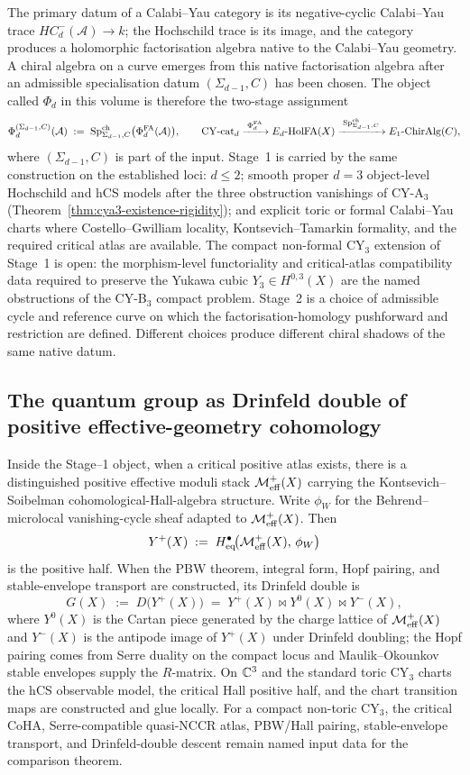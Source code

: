 The primary datum of a Calabi--Yau category is its negative-cyclic
Calabi--Yau trace \(HC^-_d(\mathcal A)\to k\); the Hochschild trace is
its image, and the category produces a holomorphic factorisation
algebra native to the Calabi--Yau geometry. A chiral algebra on a
curve emerges from this native factorisation algebra after an
admissible specialisation datum \((\Sigma_{d-1}, C)\) has been chosen.
The object called \(\Phi_d\) in this volume is therefore the two-stage
assignment
\[
\Phi_d^{(\Sigma_{d-1}, C)}(\mathcal A)
\;:=\;
\mathrm{Sp}^{\mathrm{ch}}_{\Sigma_{d-1}, C}\bigl(\Phi^{\mathrm{FA}}_d(\mathcal A)\bigr),
\qquad
\mathrm{CY}\text{-cat}_d
\xrightarrow{\;\Phi^{\mathrm{FA}}_d\;}
E_d\text{-}\mathrm{HolFA}(X)
\xrightarrow{\;\mathrm{Sp}^{\mathrm{ch}}_{\Sigma_{d-1}, C}\;}
E_1\text{-}\mathrm{ChirAlg}(C),
\]
where \((\Sigma_{d-1}, C)\) is part of the input. Stage~1 is carried by
the same construction on the established loci: \(d \leq 2\); smooth
proper \(d=3\) object-level Hochschild and hCS models after the three
obstruction vanishings of CY-A$_3$
(Theorem~\ref{thm:cya3-existence-rigidity}); and explicit toric or
formal Calabi--Yau charts where Costello--Gwilliam locality,
Kontsevich--Tamarkin formality, and the required critical atlas are
available. The compact non-formal CY$_3$ extension of Stage~1 is open: the
morphism-level functoriality and critical-atlas compatibility data
required to preserve the Yukawa cubic $Y_3 \in H^{0,3}(X)$ are the
named obstructions of the CY-B$_3$ compact problem. Stage~2 is a
choice of admissible cycle
and reference curve on which the factorisation-homology pushforward and
restriction are defined. Different choices produce different chiral
shadows of the same native datum.

\subsection*{The quantum group as Drinfeld double of positive
effective-geometry cohomology}
\label{wn:sec:platonic-preface-quantum-group}

Inside the Stage--1 object, when a critical positive atlas exists, there
is a distinguished positive effective moduli stack $\mathcal{M}^{+}_{\mathrm{eff}}(X)$ carrying
the Kontsevich--Soibelman cohomological-Hall-algebra structure. Write
$\phi_W$ for the Behrend--microlocal vanishing-cycle sheaf adapted to
$\mathcal{M}^{+}_{\mathrm{eff}}(X)$. Then
\[
Y^+(X) \;:=\; H^{\bullet}_{\mathrm{eq}}\!\bigl(\mathcal{M}^{+}_{\mathrm{eff}}(X),\,\phi_W\bigr)
\]
is the positive half. When the PBW theorem, integral form, Hopf pairing,
and stable-envelope transport are constructed, its Drinfeld double is
\[
G(X) \;:=\; D\bigl(Y^+(X)\bigr) \;=\; Y^+(X) \bowtie Y^0(X) \bowtie Y^-(X),
\]
where $Y^0(X)$ is the Cartan piece generated by the charge lattice of
$\mathcal{M}^{+}_{\mathrm{eff}}(X)$ and $Y^-(X)$ is the antipode image of $Y^+(X)$ under
Drinfeld doubling; the Hopf pairing comes from Serre duality on the
compact locus and Maulik--Okounkov stable envelopes supply the
$R$-matrix. On
\(\mathbb{C}^3\) and the standard toric CY$_3$ charts the hCS observable
model, the critical Hall positive half, and the chart transition maps
are constructed and glue locally. For a compact non-toric CY$_3$, the
critical CoHA, Serre-compatible quasi-NCCR atlas, PBW/Hall pairing,
stable-envelope transport, and Drinfeld-double descent remain named
input data for the comparison theorem.

